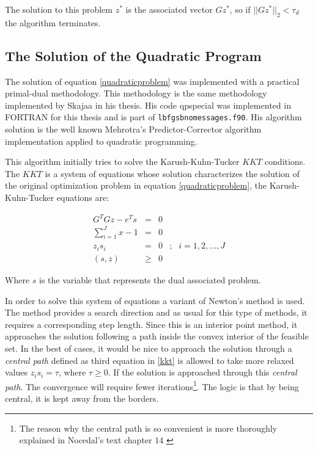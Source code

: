 The solution to this problem $z^*$ is the associated vector $Gz^*$, so if $||Gz^*||_2 < \tau_d$ the algorithm terminates.

\subsection{The Solution of the Quadratic Program}

The solution of equation \eqref{quadraticproblem} was implemented with a practical primal-dual methodology. This methodology is the same methodology implemented by Skajaa \citep{skajaa} in his thesis. His code \textsf{qpspecial} was implemented in \textsc{FORTRAN} for this thesis and is part of \texttt{lbfgsbnomessages.f90}. His algorithm solution is the well known Mehrotra's Predictor-Corrector algorithm implementation applied to quadratic programming.

This algorithm initially tries to solve the Karush-Kuhn-Tucker $KKT$ conditions. The $KKT$ is a system of equations whose solution characterizes the solution of the original optimization problem in equation \eqref{quadraticproblem}, the Karush-Kuhn-Tucker equations are:

\begin{equation} \label{kkt}
  \begin{aligned}
    G^TGz - e^Ts
    & = & 0 & \\
    \sum_{i = 1}^J x - 1
    & = & 0 & \\
    z_is_i & = & 0 &; &i = 1,2, \dots, J\\
    (s, z) & \geq & 0 &
  \end{aligned}
\end{equation}

Where $s$ is the variable that represents the dual associated problem.

In order to solve this system of equations a variant of Newton's method is used. The method provides a search direction and as usual for this type of methods, it  requires a corresponding step length. Since this is an interior point method, it approaches the solution following a path inside the convex interior of the feasible set.  In the best of cases, it would be nice to approach the solution through a \emph{central path} defined as third equation in \eqref{kkt} is allowed to take more relaxed values $z_is_i = \tau$, where $\tau \geq 0$. If the solution is approached through this \emph{central path}. The convergence will require fewer iterations\footnote{The reason why the central path is so convenient is more thoroughly explained in Nocedal's text chapter $14$ \citep{nocedal}}. The logic is that by being central, it is kept away from the borders.

